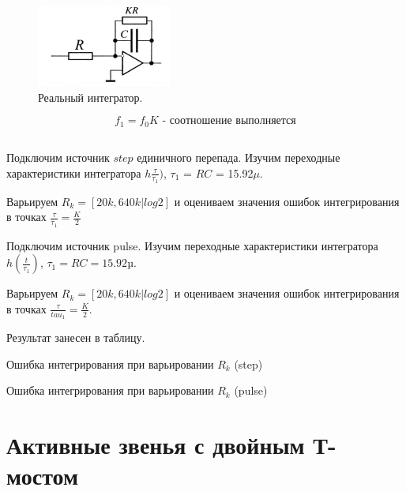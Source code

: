 \documentclass[15pt,a5paper,reqno]{article}
\begin{document}
\begin{figure}[h!]
  \centering
  \includegraphics[width=0.4\linewidth]{pics/pic4.png}
  \caption{Реальный интегратор.}
  \label{}
\end{figure}


\begin{equation*}
    f_1 = f_0K \text { - соотношение выполняется}
\end{equation*}

\subsection{}

Подключим источник $step$ единичного перепада. Изучим переходные характеристики интегратора $ h \frac{\tau}{\tau_1})$, $\tau_1$ = $RC$ = 15.92$\mu$.

Варьируем $R_k = [20k, 640k| log 2]$ и оцениваем значения ошибок интегрирования в точках $\frac{\tau}{\tau_1} = \frac{K}{2}$

Подключим источник pulse. Изучим переходные характеристики интегратора $ h (\frac{t}{\tau_1})$, $\tau_1 = RC = 15.92µ$. 

Варьируем $R_k = [20k, 640k| log 2]$ и оцениваем значения ошибок интегрирования в точках  $\frac{\tau}{tau_1} = \frac{K}{2}$. 

Результат занесен в таблицу.

\begin{table}[h!]
	\centering
	
	\caption{Ошибка интегрирования при варьировании $R_k$ (step)}
	\label{nu1}
\end{table}

\begin{table}[h!]
	\centering
	
	\caption{Ошибка интегрирования при варьировании $R_k$ (pulse)}
	\label{nu1}
\end{table}

\newpage

\section{Активные звенья с двойным Т-мостом}
\end{document}
